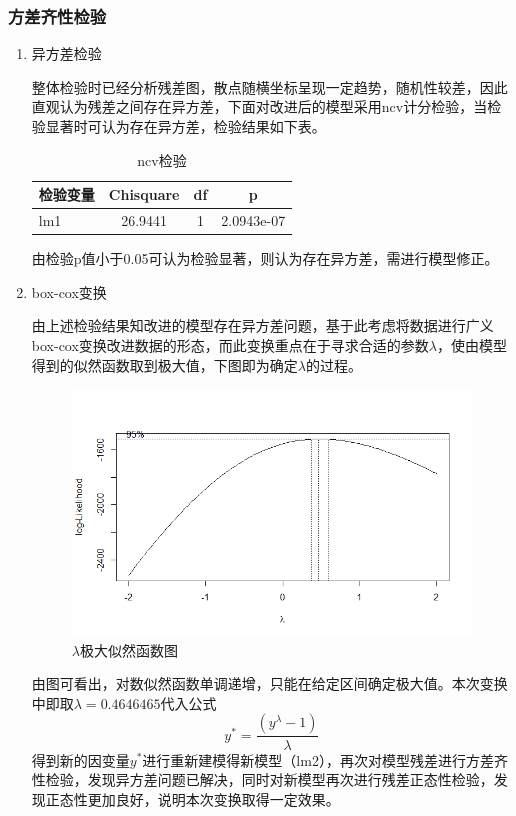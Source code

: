 \documentclass[a4paper,12pt,onecolumn,oneside]{article}
\begin{document}
\subsubsection{方差齐性检验}
\begin{enumerate}
	\item 异方差检验\par 整体检验时已经分析残差图，散点随横坐标呈现一定趋势，随机性较差，因此直观认为残差之间存在异方差，下面对改进后的模型采用ncv计分检验，当检验显著时可认为存在异方差，检验结果如下表。
	\begin{table}[htbp]
		\centering
		\caption{ncv检验}\vspace{0.5\baselineskip}
		\label{tab:ncv_test}
		\begin{tabular}{@{}lccc@{}}
			\toprule
			检验变量 & Chisquare & df & p \\
			\midrule
			lm1 & 26.9441 & 1 & 2.0943e-07 \\
			\bottomrule
		\end{tabular}
	\end{table}
	由检验p值小于0.05可认为检验显著，则认为存在异方差，需进行模型修正。
	\item box-cox变换 \par 由上述检验结果知改进的模型存在异方差问题，基于此考虑将数据进行广义box-cox变换改进数据的形态，而此变换重点在于寻求合适的参数$\lambda$，使由模型得到的似然函数取到极大值，下图即为确定$\lambda$的过程。
	\begin{figure}[H]
	\centering
	\includegraphics[width=\textwidth]{res/tu2.3.3.png}
	\caption{$\lambda$极大似然函数图}
	\label{fig:tu2.3.3}
\end{figure}
由图可看出，对数似然函数单调递增，只能在给定区间确定极大值。本次变换中即取$\lambda=0.4646465$代入公式
\begin{equation}\label{eq:1}
	y^{*} = \frac{(y^{\lambda}-1)}{\lambda}
\end{equation}
得到新的因变量$y^{*}$进行重新建模得新模型（lm2），再次对模型残差进行方差齐性检验，发现异方差问题已解决，同时对新模型再次进行残差正态性检验，发现正态性更加良好，说明本次变换取得一定效果。
\end{enumerate}
\end{document}
